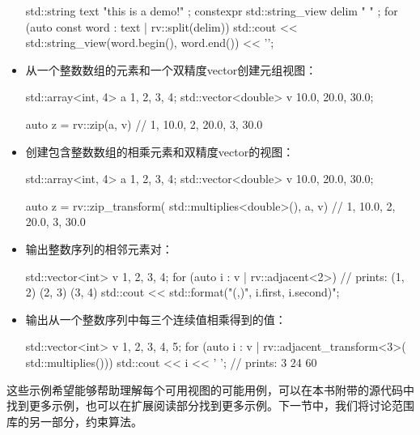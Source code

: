 \begin{itemize}
        \begin{cppcode}
std::string text{ "this is a demo!" };
constexpr std::string_view delim{ " " };
for (auto const word : text | rv::split(delim))
{
	std::cout << std::string_view(word.begin(),
								  word.end())
			  << '\n';
}
\end{cppcode}
  \item 从一个整数数组的元素和一个双精度vector创建元组视图：

        \begin{cppcode}
std::array<int, 4> a {1, 2, 3, 4};
std::vector<double> v {10.0, 20.0, 30.0};

auto z = rv::zip(a, v)
// { {1, 10.0}, {2, 20.0}, {3, 30.0} }
\end{cppcode}
  \item 创建包含整数数组的相乘元素和双精度vector的视图：

        \begin{cppcode}
std::array<int, 4> a {1, 2, 3, 4};
std::vector<double> v {10.0, 20.0, 30.0};

auto z = rv::zip_transform(
	std::multiplies<double>(), a, v)
// { {1, 10.0}, {2, 20.0}, {3, 30.0} }
\end{cppcode}
  \item 输出整数序列的相邻元素对：

        \begin{cppcode}
std::vector<int> v {1, 2, 3, 4};
for (auto i : v | rv::adjacent<2>)
{
	// prints: (1, 2) (2, 3) (3, 4)
	std::cout << std::format("({},{})",
							 i.first, i.second)";
}
\end{cppcode}
  \item 输出从一个整数序列中每三个连续值相乘得到的值：

        \begin{cppcode}
std::vector<int> v {1, 2, 3, 4, 5};
for (auto i : v | rv::adjacent_transform<3>(
	std::multiplies()))
{
	std::cout << i << ' '; // prints: 3 24 60
}
\end{cppcode}

\end{itemize}

这些示例希望能够帮助理解每个可用视图的可能用例，可以在本书附带的源代码中找到更多示例，也可以在扩展阅读部分找到更多示例。下一节中，我们将讨论范围库的另一部分，约束算法。
